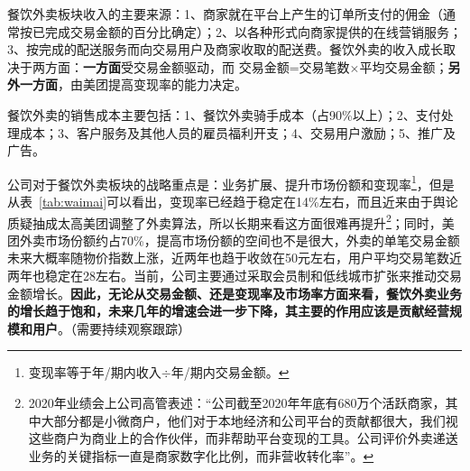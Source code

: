 \documentclass[UTF8,a4paper,12pt,lang=cn,fontset = windows]{elegantpaper} %
\begin{document}
餐饮外卖板块收入的主要来源：1、商家就在平台上产生的订单所支付的佣金（通常按已完成交易金额的百分比确定）；2、以各种形式向商家提供的在线营销服务；3、按完成的配送服务而向交易用户及商家收取的配送费。餐饮外卖的收入成长取决于两方面：\textbf{一方面}受交易金额驱动，而 交易金额=交易笔数$\times$平均交易金额；\textbf{另外一方面}，由美团提高变现率的能力决定。

餐饮外卖的销售成本主要包括：1、餐饮外卖骑手成本（占90\%以上）；2、支付处理成本；3、客户服务及其他人员的雇员福利开支；4、交易用户激励；5、推广及广告。

公司对于餐饮外卖板块的战略重点是：业务扩展、提升市场份额和变现率\footnote{变现率等于年/期内收入$\div$年/期内交易金额。}，但是从表~\ref{tab:waimai}可以看出，变现率已经趋于稳定在14\%左右，而且近来由于舆论质疑抽成太高美团调整了外卖算法，所以长期来看这方面很难再提升\footnote{2020年业绩会上公司高管表述：“公司截至2020年年底有680万个活跃商家，其中大部分都是小微商户，他们对于本地经济和公司平台的贡献都很大，我们视这些商户为商业上的合作伙伴，而非帮助平台变现的工具。公司评价外卖递送业务的关键指标一直是商家数字化比例，而非营收转化率”。}；同时，美团外卖市场份额约占70\%，提高市场份额的空间也不是很大，外卖的单笔交易金额未来大概率随物价指数上涨，近两年也趋于收敛在50元左右，用户平均交易笔数近两年也稳定在28左右。当前，公司主要通过采取会员制和低线城市扩张来推动交易金额增长。\textbf{因此，无论从交易金额、还是变现率及市场率方面来看，餐饮外卖业务的增长趋于饱和，未来几年的增速会进一步下降，其主要的作用应该是贡献经营规模和用户}。（需要持续观察跟踪）
\end{document}

